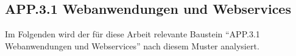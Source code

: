 	\subsection[APP.3.1]{APP.3.1 Webanwendungen und Webservices}\label{subsec:app.3.1-webanwendungen-und-webservices}

		Im Folgenden wird der für diese Arbeit relevante Baustein
		\enquote{APP.3.1 Webanwendungen und Webservices} nach diesem Muster analysiert.

		
		
		
		
		

